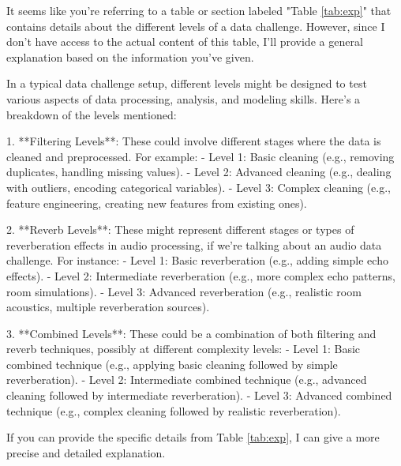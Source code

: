 It seems like you're referring to a table or section labeled "Table \ref{tab:exp}" that contains details about the different levels of a data challenge. However, since I don't have access to the actual content of this table, I'll provide a general explanation based on the information you've given.

In a typical data challenge setup, different levels might be designed to test various aspects of data processing, analysis, and modeling skills. Here's a breakdown of the levels mentioned:

1. **Filtering Levels**: These could involve different stages where the data is cleaned and preprocessed. For example:
   - Level 1: Basic cleaning (e.g., removing duplicates, handling missing values).
   - Level 2: Advanced cleaning (e.g., dealing with outliers, encoding categorical variables).
   - Level 3: Complex cleaning (e.g., feature engineering, creating new features from existing ones).

2. **Reverb Levels**: These might represent different stages or types of reverberation effects in audio processing, if we're talking about an audio data challenge. For instance:
   - Level 1: Basic reverberation (e.g., adding simple echo effects).
   - Level 2: Intermediate reverberation (e.g., more complex echo patterns, room simulations).
   - Level 3: Advanced reverberation (e.g., realistic room acoustics, multiple reverberation sources).

3. **Combined Levels**: These could be a combination of both filtering and reverb techniques, possibly at different complexity levels:
   - Level 1: Basic combined technique (e.g., applying basic cleaning followed by simple reverberation).
   - Level 2: Intermediate combined technique (e.g., advanced cleaning followed by intermediate reverberation).
   - Level 3: Advanced combined technique (e.g., complex cleaning followed by realistic reverberation).

If you can provide the specific details from Table \ref{tab:exp}, I can give a more precise and detailed explanation.
